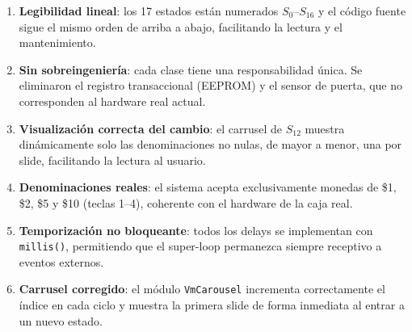 \documentclass[12pt,a4paper]{article}
\begin{document}
\begin{enumerate}
    \item \textbf{Legibilidad lineal}: los 17 estados están numerados
          $S_0$–$S_{16}$ y el código fuente sigue el mismo orden de arriba
          a abajo, facilitando la lectura y el mantenimiento.
    \item \textbf{Sin sobreingeniería}: cada clase tiene una responsabilidad
          única. Se eliminaron el registro transaccional (EEPROM) y el sensor
          de puerta, que no corresponden al hardware real actual.
    \item \textbf{Visualización correcta del cambio}: el carrusel de $S_{12}$
          muestra dinámicamente solo las denominaciones no nulas, de mayor
          a menor, una por slide, facilitando la lectura al usuario.
    \item \textbf{Denominaciones reales}: el sistema acepta exclusivamente
          monedas de \$1, \$2, \$5 y \$10 (teclas 1–4), coherente con el
          hardware de la caja real.
    \item \textbf{Temporización no bloqueante}: todos los delays se implementan
          con \texttt{millis()}, permitiendo que el super-loop permanezca
          siempre receptivo a eventos externos.
    \item \textbf{Carrusel corregido}: el módulo \texttt{VmCarousel} incrementa
          correctamente el índice en cada ciclo y muestra la primera slide
          de forma inmediata al entrar a un nuevo estado.
\end{enumerate}
\end{document}
